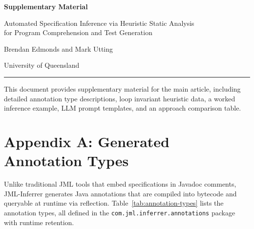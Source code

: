 \documentclass[11pt]{article}
\begin{document}
\begin{center}
{\LARGE\bfseries Supplementary Material}
\vspace{0.5em}

{\large Automated Specification Inference via Heuristic Static Analysis\\for Program Comprehension and Test Generation}
\vspace{0.5em}

{\normalsize Brendan Edmonds and Mark Utting}

{\small University of Queensland}
\end{center}

\vspace{1em}
\hrule
\vspace{1em}

\noindent This document provides supplementary material for the main article, including detailed annotation type descriptions, loop invariant heuristic data, a worked inference example, LLM prompt templates, and an approach comparison table.

\tableofcontents
\vspace{1em}

\section{Appendix A: Generated Annotation Types}
\label{app:annotation-types}

Unlike traditional JML tools that embed specifications in Javadoc comments, JML-Inferrer generates Java annotations that are compiled into bytecode and queryable at runtime via reflection. Table~\ref{tab:annotation-types} lists the annotation types, all defined in the \texttt{com.jml.inferrer.annotations} package with runtime retention.
\end{document}
